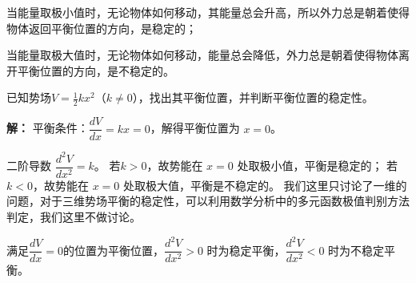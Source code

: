 当能量取极小值时，无论物体如何移动，其能量总会升高，所以外力总是朝着使得物体返回平衡位置的方向，是稳定的；

当能量取极大值时，无论物体如何移动，能量总会降低，外力总是朝着使得物体离开平衡位置的方向，是不稳定的。
\begin{tcolorbox}[colback=white!5!white,colframe=green!50!black,title=例题]
    已知势场$V =  \frac{1}{2}k x^2$（$k \neq 0$），找出其平衡位置，并判断平衡位置的稳定性。
\end{tcolorbox}
\noindent \textbf{解：}
平衡条件：$\dfrac{dV}{dx} = kx = 0$，解得平衡位置为 $x = 0$。

二阶导数 $\dfrac{d^2V}{dx^2} = k$。
若$k > 0$，故势能在 $x=0$ 处取极小值，平衡是稳定的；
若$k < 0$，故势能在 $x=0$ 处取极大值，平衡是不稳定的。
我们这里只讨论了一维的问题，对于三维势场平衡的稳定性，可以利用数学分析中的多元函数极值判别方法判定，我们这里不做讨论。
\begin{tcolorbox}[colback=white!5!white, colframe=red!75!black, title=平衡及其稳定性小结]
    满足$\dfrac{dV}{dx} =0$的位置为平衡位置，$\dfrac{d^2V}{dx^2} >0$ 时为稳定平衡，$\dfrac{d^2V}{dx^2}<0 $ 时为不稳定平衡。
\end{tcolorbox}
